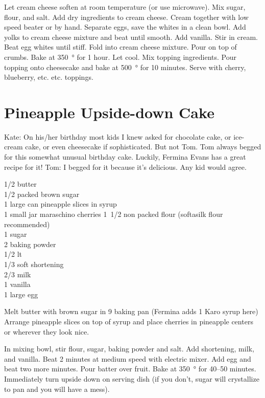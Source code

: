Let cream cheese soften at room temperature (or use microwave).  Mix sugar,
flour, and salt.  Add dry ingredients to cream cheese.  Cream together with
low speed beater or by hand.  Separate eggs, save the whites in a clean bowl.
Add yolks to cream cheese mixture and beat until smooth.  Add vanilla.  Stir
in cream.  Beat egg whites until stiff.  Fold into cream cheese mixture.  Pour
on top of crumbs.  Bake at \SI{350}{\degree} for 1 hour.  Let cool.  Mix
topping ingredients.  Pour topping onto cheesecake and bake at
\SI{500}{\degree} for 10 minutes.  Serve with cherry, blueberry,
etc. etc. toppings.

\section{Pineapple Upside-down Cake}

\begin{open}
  Kate: On his/her birthday most kids I knew asked for chocolate cake, or
  ice-cream cake, or even cheesecake if sophisticated. But not Tom.  Tom always
  begged for this somewhat unusual birthday cake. Luckily, Fermina Evans has a
  great recipe for it!  Tom: I begged for it because it's delicious. Any kid
  would agree.
\end{open}
\begin{ingredients}
  \SI{1/2}{\cup} butter \\
  \SI{1/2}{\cup} packed brown sugar \\
  1 large can pineapple slices in syrup \\
  1 small jar maraschino cherries
  \SI{1/2}[1]{\cup} non packed flour (softasilk flour recommended) \\
  \SI{1}{\cup} sugar \\
  \SI{2}{\teaspoon} baking powder \\
  \SI{1/2}{\teaspoon} lt \\
  \SI{1/3}{\cup} soft shortening \\
  \SI{2/3}{\cup} milk \\
  \SI{1}{\teaspoon} vanilla \\
  1 large egg
\end{ingredients}
Melt butter with brown sugar in \SI{9}{\inch} baking pan (Fermina adds
\SI{1}{\tblspoon} Karo syrup here) Arrange pineapple slices on top of syrup
and place cherries in pineapple centers or wherever they look nice.

In mixing bowl, stir flour, sugar, baking powder and salt. Add shortening,
milk, and vanilla. Beat 2 minutes at medium speed with electric mixer. Add egg
and beat two more minutes. Pour batter over fruit. Bake at \SI{350}{\degree}
for \numrange{40}{50} minutes. Immediately turn upside down on serving dish
(if you don't, sugar will crystallize to pan and you will have a mess).

